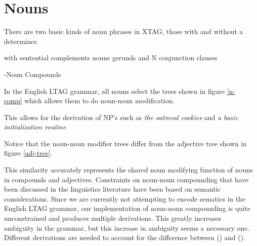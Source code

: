 \section{Nouns}

There are two basic kinds of noun phrases in XTAG, those with and without a determiner.

\Nouns with sentential complements
\Predicative nouns
\Noun gerunds
\NP and N conjunction
\Relative clauses

\Noun-Noun Compounds

In the English LTAG grammar, all nouns select the trees shown in
figure \ref{n-comp} which allows them to do noun-noun modification.

\begin{figure}[h]
\end{figure}

This allows for the derivation of NP's such as {\it the oatmeal cookies}
and {\it a basic initialization routine}

\begin{figure}[h]
\end{figure}

Notice that the noun-noun modifier trees differ from the adjective
tree shown in figure \ref{adj-tree}.

\begin{figure}
\end{figure}

This similarity accurately represents the shared noun modifying
function of nouns in compounds and adjectives.  Constraints on
noun-noun compounding that have been discussed in the linguistics
literature have been based on semantic considerations. Since we are
currently not attempting to encode sematics in the English LTAG
grammar, our implementation of noun-noun compounding is quite
unconstrained and produces multiple derivations. This greatly
increases ambiguity in the grammar, but this increase in ambiguity
seems a necessary one.  Different derivations are needed to account
for the difference between () and ().








